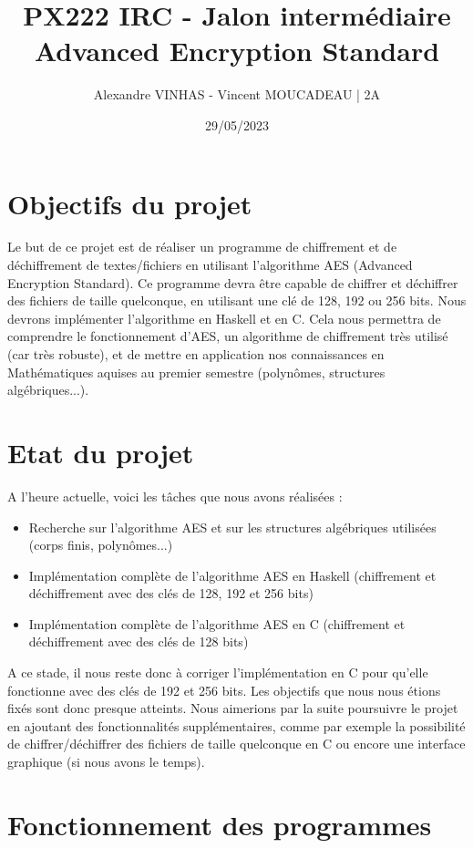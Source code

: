 \documentclass[12pt]{article}
\title{PX222 IRC - Jalon intermédiaire \\ Advanced Encryption Standard}
\author{Alexandre VINHAS - Vincent MOUCADEAU | 2A}
\date{29/05/2023}
\begin{document}
\maketitle



\section{Objectifs du projet}
Le but de ce projet est de réaliser un programme de chiffrement et de déchiffrement de textes/fichiers en utilisant l'algorithme AES (Advanced Encryption Standard). Ce programme devra être capable de chiffrer et déchiffrer des fichiers de taille quelconque, en utilisant une clé de 128, 192 ou 256 bits. Nous devrons implémenter l'algorithme en Haskell et en C. Cela nous permettra de comprendre le fonctionnement d'AES, un algorithme de chiffrement très utilisé (car très robuste), et de mettre en application nos connaissances en Mathématiques aquises au premier semestre (polynômes, structures algébriques...).

\section{Etat du projet}
\noindent A l'heure actuelle, voici les tâches que nous avons réalisées :
\begin{itemize}
    \item Recherche sur l'algorithme AES et sur les structures algébriques utilisées (corps finis, polynômes...)
    \item Implémentation complète de l'algorithme AES en Haskell (chiffrement et déchiffrement avec des clés de 128, 192 et 256 bits)
    \item Implémentation complète de l'algorithme AES en C (chiffrement et déchiffrement avec des clés de 128 bits)
\end{itemize}
A ce stade, il nous reste donc à corriger l'implémentation en C pour qu'elle fonctionne avec des clés de 192 et 256 bits. Les objectifs que nous nous étions fixés sont donc presque atteints. Nous aimerions par la suite poursuivre le projet en ajoutant des fonctionnalités supplémentaires, comme par exemple la possibilité de chiffrer/déchiffrer des fichiers de taille quelconque en C ou encore une interface graphique (si nous avons le temps). 

\section{Fonctionnement des programmes}
\end{document}
